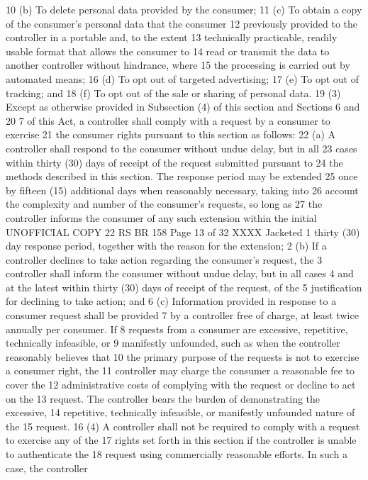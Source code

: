 10 (b) To delete personal data provided by the consumer;
11 (c) To obtain a copy of the consumer's personal data that the consumer
12 previously provided to the controller in a portable and, to the extent
13 technically practicable, readily usable format that allows the consumer to
14 read or transmit the data to another controller without hindrance, where
15 the processing is carried out by automated means;
16 (d) To opt out of targeted advertising;
17 (e) To opt out of tracking; and
18 (f) To opt out of the sale or sharing of personal data.
19 (3) Except as otherwise provided in Subsection (4) of this section and Sections 6 and
20 7 of this Act, a controller shall comply with a request by a consumer to exercise
21 the consumer rights pursuant to this section as follows:
22 (a) A controller shall respond to the consumer without undue delay, but in all
23 cases within thirty (30) days of receipt of the request submitted pursuant to
24 the methods described in this section. The response period may be extended
25 once by fifteen (15) additional days when reasonably necessary, taking into
26 account the complexity and number of the consumer's requests, so long as
27 the controller informs the consumer of any such extension within the initial 
UNOFFICIAL COPY 22 RS BR 158
Page 13 of 32
XXXX Jacketed
1 thirty (30) day response period, together with the reason for the extension;
2 (b) If a controller declines to take action regarding the consumer's request, the
3 controller shall inform the consumer without undue delay, but in all cases
4 and at the latest within thirty (30) days of receipt of the request, of the
5 justification for declining to take action; and
6 (c) Information provided in response to a consumer request shall be provided
7 by a controller free of charge, at least twice annually per consumer. If
8 requests from a consumer are excessive, repetitive, technically infeasible, or
9 manifestly unfounded, such as when the controller reasonably believes that
10 the primary purpose of the requests is not to exercise a consumer right, the
11 controller may charge the consumer a reasonable fee to cover the
12 administrative costs of complying with the request or decline to act on the
13 request. The controller bears the burden of demonstrating the excessive,
14 repetitive, technically infeasible, or manifestly unfounded nature of the
15 request.
16 (4) A controller shall not be required to comply with a request to exercise any of the
17 rights set forth in this section if the controller is unable to authenticate the
18 request using commercially reasonable efforts. In such a case, the controller
